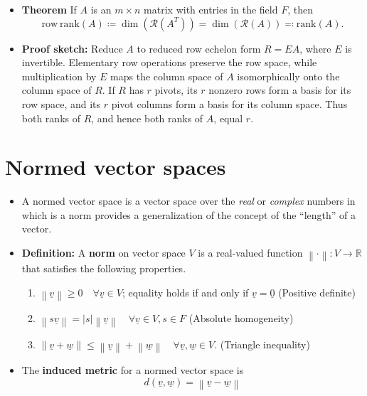 \documentclass[11pt,twoside]{report}
\newcommand{\bbR}{{\mathbb{R}}}
\newcommand{\vecnot}{\underline}
\newcommand{\Rank}{\mathrm{rank}}
\begin{document}
\begin{itemize}
\item \textbf{Theorem}
If $A$ is an $m \times n$ matrix with entries in the field $F$, then 
\begin{equation*} 
\mathrm{row~rank} (A) \coloneqq \dim( \mathcal{R}(A^T)) =  \dim( \mathcal{R}(A))\eqqcolon \Rank (A).
\end{equation*}

\item \textbf{Proof sketch:} Reduce $A$ to reduced row echelon form $R=EA$, where $E$ is invertible.  Elementary row operations preserve the row space, while multiplication by $E$ maps the column space of $A$ isomorphically onto the column space of $R$.  If $R$ has $r$ pivots, its $r$ nonzero rows form a basis for its row space, and its $r$ pivot columns form a basis for its column space.  Thus both ranks of $R$, and hence both ranks of $A$, equal $r$.




\end{itemize}


\section{Normed vector spaces} 



\begin{itemize}

\item A normed vector space is a vector space over the \emph{real} or \emph{complex} numbers in which is a norm provides a generalization of the concept of the ``length'' of a vector. 

\item \textbf{Definition:} 
A \textbf{norm} on vector space $V$ is a real-valued function $\left\| \cdot \right\| \colon V \rightarrow \bbR$ that satisfies the following properties.
\begin{enumerate}
\item $\left\| \vecnot{v} \right\| \geq 0 \quad \forall \vecnot{v} \in V$;
equality holds if and only if $\vecnot{v} = \vecnot{0}$ \hfill (Positive definite)
\item $\left\| s \vecnot{v} \right\| = |s| \left\| \vecnot{v} \right\| \quad \forall \vecnot{v} \in V, s \in F$ \hfill (Absolute homogeneity)
\item $\left\| \vecnot{v} + \vecnot{w} \right\| \leq  
\left\| \vecnot{v} \right\| + \left\| \vecnot{w} \right\| \quad \forall \vecnot{v}, \vecnot{w} \in V$. \hfill (Triangle inequality)
\end{enumerate}


\item The \textbf{induced metric} for a normed vector space is 
\[
d \left( \vecnot{v}, \vecnot{w} \right)
= \left\| \vecnot{v} - \vecnot{w} \right\|
\]


\end{itemize}
\end{document}
